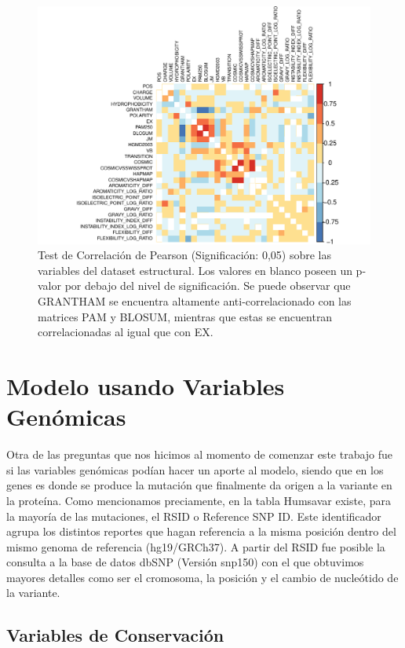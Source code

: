 \begin{figure}[H]
    \centering
    \includegraphics[scale=0.8]{documents/latex/figures/3/corrplot_1.pdf}
    \caption{Test de Correlación de Pearson (Significación: 0,05) sobre las variables del dataset estructural. Los valores en blanco poseen un p-valor por debajo del nivel de significación. Se puede observar que GRANTHAM se encuentra altamente anti-correlacionado con las matrices PAM y BLOSUM, mientras que estas se encuentran correlacionadas al igual que con EX.}
    \label{fig:corrplot_1}
\end{figure}

\newpage

\section{Modelo usando Variables Genómicas}

Otra de las preguntas que nos hicimos al momento de comenzar este trabajo fue si las variables genómicas podían hacer un aporte al modelo, siendo que en los genes es donde se produce la mutación que finalmente da origen a la variante en la proteína. Como mencionamos preciamente, en la tabla Humsavar existe, para la mayoría de las mutaciones, el RSID o Reference SNP ID. Este identificador agrupa los distintos reportes que hagan referencia a la misma posición dentro del mismo genoma de referencia (hg19/GRCh37). A partir del RSID fue posible la consulta a la base de datos dbSNP (Versión snp150) con el que obtuvimos mayores detalles como ser el cromosoma, la posición y el cambio de nucleótido de la variante. 


\subsection{Variables de Conservación}

